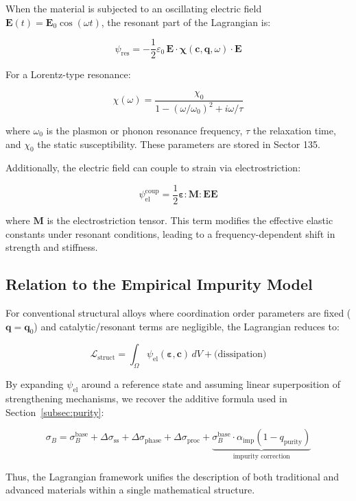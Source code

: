 \documentclass[12pt,a4paper]{article}
\begin{document}
	When the material is subjected to an oscillating electric field \(\mathbf{E}(t) = \mathbf{E}_0 \cos(\omega t)\), the resonant part of the Lagrangian is:
	
	\[
	\psi_{\mathrm{res}} = -\frac{1}{2}\varepsilon_0\, \mathbf{E} \cdot \boldsymbol{\chi}(\mathbf{c}, \mathbf{q}, \omega) \cdot \mathbf{E}
	\]
	
	For a Lorentz-type resonance:
	
	\[
	\chi(\omega) = \frac{\chi_0}{1 - (\omega/\omega_0)^2 + i\omega/\tau}
	\]
	
	where \(\omega_0\) is the plasmon or phonon resonance frequency, \(\tau\) the relaxation time, and \(\chi_0\) the static susceptibility. These parameters are stored in Sector 135.
	
	Additionally, the electric field can couple to strain via electrostriction:
	
	\[
	\psi_{\mathrm{el}}^{\mathrm{coup}} = \frac{1}{2} \boldsymbol{\varepsilon} : \mathbf{M} : \mathbf{E}\mathbf{E}
	\]
	
	where \(\mathbf{M}\) is the electrostriction tensor. This term modifies the effective elastic constants under resonant conditions, leading to a frequency-dependent shift in strength and stiffness.
	
	\subsection{Relation to the Empirical Impurity Model}
	\label{subsec:relation-empirical}
	
	For conventional structural alloys where coordination order parameters are fixed (\(\mathbf{q} = \mathbf{q}_0\)) and catalytic/resonant terms are negligible, the Lagrangian reduces to:
	
	\[
	\mathcal{L}_{\mathrm{struct}} = \int_{\Omega} \psi_{\mathrm{el}}(\boldsymbol{\varepsilon}, \mathbf{c}) \, dV + \text{(dissipation)}
	\]
	
	By expanding \(\psi_{\mathrm{el}}\) around a reference state and assuming linear superposition of strengthening mechanisms, we recover the additive formula used in Section~\ref{subsec:purity}:
	
	\[
	\sigma_B = \sigma_B^{\mathrm{base}} + \Delta\sigma_{\mathrm{ss}} + \Delta\sigma_{\mathrm{phase}} + \Delta\sigma_{\mathrm{proc}} + \underbrace{\sigma_B^{\mathrm{base}} \cdot \alpha_{\mathrm{imp}} (1 - q_{\mathrm{purity}})}_{\text{impurity correction}}
	\]
	
	Thus, the Lagrangian framework unifies the description of both traditional and advanced materials within a single mathematical structure.
	
\end{document}
